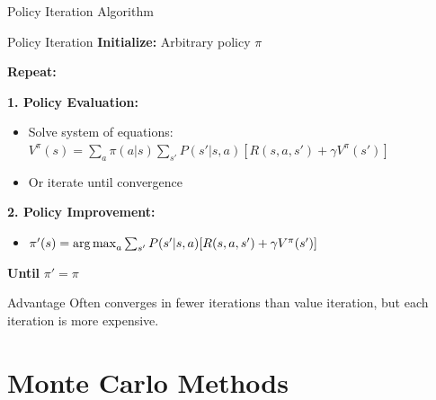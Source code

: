 \documentclass[aspectratio=169]{beamer}
\begin{document}
\begin{frame}{Policy Iteration Algorithm}
  \begin{examplebox}{Policy Iteration}
    \textbf{Initialize:} Arbitrary policy $\pi$

    \textbf{Repeat:}

    \textbf{1. Policy Evaluation:}
    \begin{itemize}
      \item Solve system of equations: $V^\pi(s) = \sum_a \pi(a|s) \sum_{s'} P(s'|s,a)[R(s,a,s') + \gamma V^\pi(s')]$
      \item Or iterate until convergence
    \end{itemize}

    \textbf{2. Policy Improvement:}
    \begin{itemize}
      \item $\pi'(s) = \operatorname*{arg\,max}_a \sum_{s'} P(s'|s,a)[R(s,a,s') + \gamma V^\pi(s')]$
    \end{itemize}

    \textbf{Until} $\pi' = \pi$
  \end{examplebox}

  \vspace{0.5em}

  \begin{alertbox}{Advantage}
    Often converges in fewer iterations than value iteration, but each iteration is more expensive.
  \end{alertbox}
\end{frame}

\section{Monte Carlo Methods}
\end{document}
